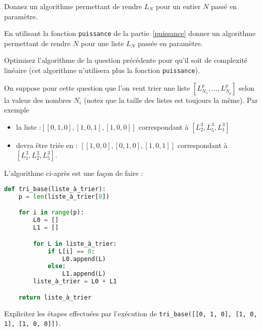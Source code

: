 \begin{exo}
\begin{partie}[Conversions]
\begin{questionpartie} 
Donnez un algorithme permettant de rendre $L_N$ pour un entier $N$ passé en paramètre.
\end{questionpartie}

\begin{questionpartie} 
En utilisant la fonction \verb|puissance| de la partie~\ref{puissance} donner un algorithme permettant de rendre $N$ pour une liste $L_N$ passée en paramètre.
\end{questionpartie}

\begin{questionpartie} 
Optimisez l'algorithme de la question précédente pour qu'il soit de complexité linéaire (cet algorithme n'utilisera plus la fonction \verb|puissance|).
\end{questionpartie}
\end{partie}

\begin{partie}

On suppose pour cette question que l'on veut trier une liste $[L^p_{N_1}, \dots, L^p_{N_q}]$ selon la valeur des nombres $N_i$ (notez que la taille des listes est toujours la même). Par exemple 

\begin{itemize}
\item la liste :$[[0, 1, 0], [1, 0, 1], [1, 0, 0]]$ correspondant à $[L_2^3, L_5^3, L_1^3]$
\item  devra être triée en : $[[1, 0, 0], [0, 1, 0], [1, 0, 1]]$ correspondant à $[L_1^3, L_2^3, L_5^3]$.
\end{itemize}

L'algorithme ci-après est une façon de faire :

\begin{lstlisting}[language=Python]
def tri_base(liste_à_trier):
    p = len(liste_à_trier[0])

    for i in range(p):
        L0 = []
        L1 = []

        for L in liste_à_trier:
            if L[i] == 0:
                L0.append(L)
            else:
                L1.append(L)
        liste_à_trier = L0 + L1

    return liste_à_trier
\end{lstlisting}

\begin{questionpartie} 
Explicitez les étapes effectuées par l'exécution de \verb|tri_base([[0, 1, 0], [1, 0, 1], [1, 0, 0]])|.
\end{questionpartie}


\end{partie}
\end{exo}
